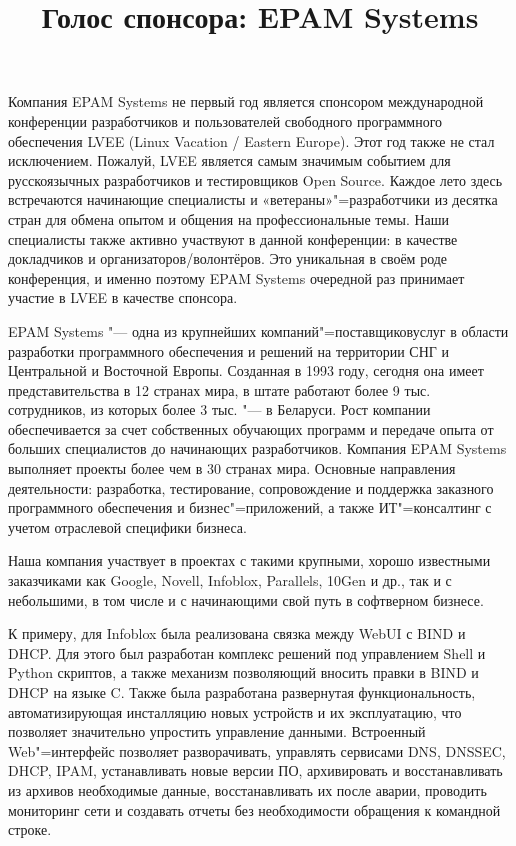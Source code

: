 \documentclass[10pt, a5paper]{article}
\begin{document}
\title{Голос спонсора: EPAM Systems}
\date{}
\maketitle

Компания EPAM Systems не первый год является спонсором международной конференции разработчиков и пользователей свободного программного обеспечения LVEE (Linux Vacation / Eastern Europe). Этот год также не стал исключением. Пожалуй, LVEE является самым значимым событием для русскоязычных разработчиков и тестировщиков Open Source. Каждое лето здесь встречаются начинающие специалисты и «ветераны»"=разработчики из десятка стран для обмена опытом и общения на профессиональные темы. Наши специалисты также активно участвуют в данной конференции: в качестве докладчиков и организаторов/волонтёров. Это уникальная в своём роде конференция, и именно поэтому EPAM Systems очередной раз принимает участие в LVEE в качестве спонсора.


EPAM Systems "--- одна из крупнейших компаний"=поставщиков\linebreak услуг в области разработки программного обеспечения и решений на территории СНГ и Центральной и Восточной Европы. Созданная в 1993 году, сегодня она имеет представительства в 12 странах мира, в штате работают более 9 тыс. сотрудников, из которых более 3 тыс. "--- в Беларуси. Рост компании обеспечивается за счет собственных обучающих программ и передаче опыта от больших специалистов до начинающих разработчиков. Компания EPAM Systems выполняет проекты более чем в 30 странах мира. Основные направления деятельности: разработка, тестирование, сопровождение и поддержка заказного программного обеспечения и бизнес"=приложений, а также ИТ"=консалтинг с учетом отраслевой специфики бизнеса.

Наша компания участвует в проектах с такими крупными, хорошо известными заказчиками как Google, Novell, Infoblox, Parallels, 10Gen и др., так и с небольшими, в том числе и с начинающими свой путь в софтверном бизнесе.


К примеру, для Infoblox была реализована связка между WebUI с BIND и DHCP. Для этого был разработан комплекс решений под управлением Shell и Python скриптов, а также механизм позволяющий вносить правки в BIND и DHCP на языке C. Также была разработана развернутая функциональность, автоматизирующая инсталляцию новых устройств и их эксплуатацию, что позволяет значительно упростить управление данными. Встроенный Web"=интерфейс позволяет разворачивать, управлять сервисами DNS, DNSSEC, DHCP, IPAM, устанавливать новые версии ПО, архивировать и восстанавливать из архивов необходимые данные, восстанавливать их после аварии, проводить мониторинг сети и создавать отчеты без необходимости обращения к командной строке.
\end{document}
